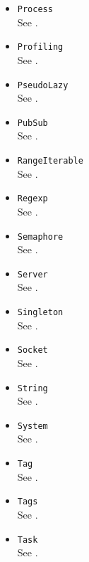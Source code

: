 \begin{itemize}
\item \lstinline|Process|\\
  See .

\item \lstinline|Profiling|\\
  See .

\item \lstinline|PseudoLazy|\\
  See .

\item \lstinline|PubSub|\\
  See .

\item \lstinline|RangeIterable|\\
  See .

\item \lstinline|Regexp|\\
  See .

\item \lstinline|Semaphore|\\
  See .

\item \lstinline|Server|\\
  See .

\item \lstinline|Singleton|\\
  See .

\item \lstinline|Socket|\\
  See .

\item \lstinline|String|\\
  See .

\item \lstinline|System|\\
  See .

\item \lstinline|Tag|\\
  See .

\item \lstinline|Tags|\\
  See .

\item \lstinline|Task|\\
  See .


\end{itemize}
